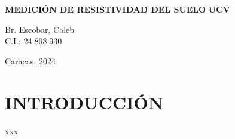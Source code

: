 \documentclass[12pt,letterpaper,oneside]{book}
\begin{document}
\thispagestyle{empty}

\frontmatter
\begin{center}
\begin{Large}
\vspace*{0.4in}
\vspace*{2in}
\textbf{MEDICIÓN DE RESISTIVIDAD DEL SUELO}
\textbf{UCV}
\end{Large}
\vspace*{0.3in}
\end{center}
\vspace*{2in}

\begin{flushright}
Br. Escobar, Caleb\\
C.I.: 24.898.930
\end{flushright}

\vspace*{0.3in}
\begin{center}
    Caracas, 2024
\end{center}

\newpage
\tableofcontents
\listoffigures
\listoftables

\mainmatter
\chapter{INTRODUCCIÓN}
xxx





%
\end{document}
